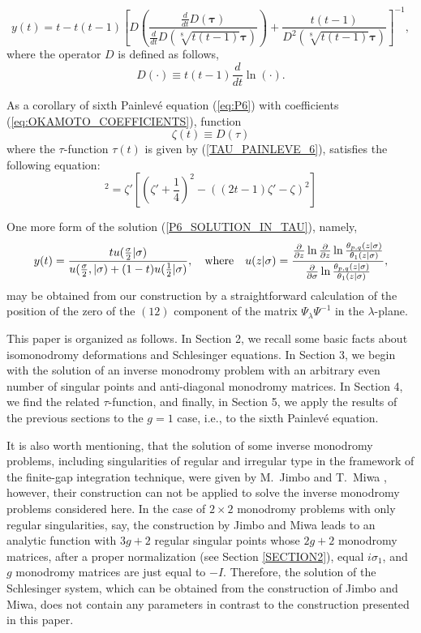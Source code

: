 \documentclass[11pt]{article}
\def\be{\begin{equation}}
\def\ee{\end{equation}}
\def\ben{\begin{displaymath}}
\def\een{\end{displaymath}}
\def\l{\lambda}
\def\la{\label}
\def\f{\frac}
\def\log{\ln}
\begin{document}
\begin{equation}
  \label{P6_SOLUTION_IN_TAU}
  y(t)=t-t(t-1)\left[D\left(\frac{\frac d{dt}D(\mathbf{\tau})}
  {\frac d{dt}D\left(\sqrt[8]{t(t-1)}\mathbf{\tau}\right)}\right)
+\frac{t(t-1)}{D^2\left(\sqrt[8]{t(t-1)}\mathbf{\tau}\right)}\right]^{-1},
\end{equation}
where the operator $D$ is defined as follows,
$$
D(\cdot)\equiv t(t-1)\frac d{dt}\log(\cdot).
$$

As a corollary of sixth Painlev\'e equation (\ref{eq:P6}) with coefficients 
(\ref{eq:OKAMOTO_COEFFICIENTS}), function 
\ben
\zeta(t)\equiv D(\tau)
\een
where the $\tau$-function $\tau(t)$ is given by (\ref{TAU_PAINLEVE_6}),
satisfies the following equation:
\be
[t(t-1)\zeta'']^2=\zeta'[(\zeta'+\f14)^2-((2t-1)\zeta'-\zeta)^2]
\la{zeta}\ee

One more form of the solution (\ref{P6_SOLUTION_IN_TAU}), namely, 
\begin{equation}
  \label{eq:ANDERE_FORM}
  y(t)=\frac{tu(\frac\sigma 2|\sigma)}{u(\frac\sigma 2,|\sigma)+
(1-t)u(\frac 12|\sigma)},\quad {\rm where}\quad u(z|\sigma)=\frac
{\frac\partial{\partial z}\log\frac\partial{\partial z}\log
\frac{\theta_{p,q}(z|\sigma)}{\theta_1(z|\sigma)}}
{\frac\partial{\partial\sigma}\log\frac{\theta_{p,q}(z|\sigma)}
{\theta_1(z|\sigma)}},
\end{equation}
may be obtained
from our construction by a straightforward calculation of the position of the
zero of the $(12)$ component of the matrix $\Psi_\l\Psi^{-1}$ in the $\l$-plane.

This paper is organized as follows.
In Section 2, we recall some basic facts about isomonodromy deformations
and Schlesinger equations.
In Section 3, we begin with the
solution of an inverse monodromy problem with an arbitrary even number 
of singular points and anti-diagonal monodromy matrices.
In Section 4, we find the related $\tau$-function, and finally, in 
Section 5, we apply the results of the previous sections to the $g=1$ case,
i.e., to the sixth Painlev\'e equation. 

It is also worth mentioning, that the solution of some
inverse monodromy 
problems, including singularities of regular and irregular type in the
framework of the finite-gap integration technique, were given by M.~Jimbo
and T.~Miwa \cite{JM}, however, their construction can not be applied to solve
the inverse monodromy problems considered here. In the
case of $2\times 2$ monodromy problems with only regular singularities, say,
the construction by Jimbo and Miwa leads to an
analytic function with $3g+2$ regular singular points whose $2g+2$ monodromy
matrices, after a proper normalization (see Section \ref{SECTION2}), equal 
$i\sigma_1$, and $g$ monodromy matrices are just equal to $-I$. 
Therefore, the solution of the Schlesinger system, which can be obtained from the construction of Jimbo and Miwa, does not contain any
parameters in contrast to the construction presented in this paper.
\end{document}
